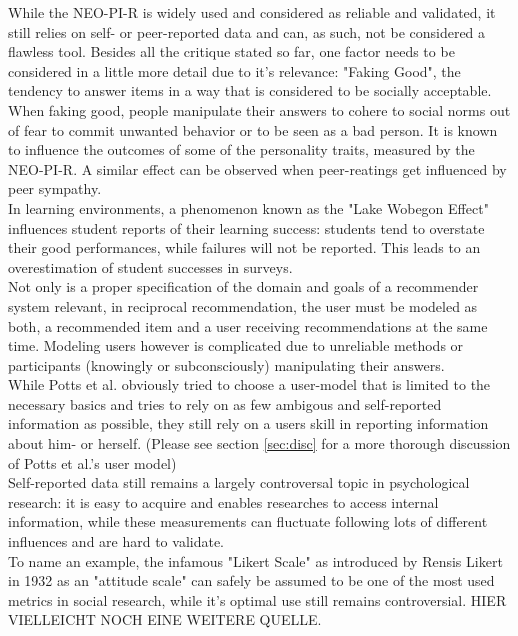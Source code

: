 \documentclass[nochapterpage,bigchapter,linedtoc,longdoc,colorback,accentcolor=tud3b,oneside]{tudreport}
\begin{document}
While the NEO-PI-R is widely used and considered as reliable and validated, it still relies on self- or peer-reported data and can, as such, not be considered a flawless tool. Besides all the critique stated so far, one factor needs to be considered in a little more detail due to it's relevance: "Faking Good", the tendency to answer items in a way that is considered to be socially acceptable. When faking good, people manipulate their answers to cohere to social norms out of fear to commit unwanted behavior or to be seen as a bad person. It is known to influence the outcomes of some of the personality traits, measured by the NEO-PI-R.\cite{griffin2004applicants} A similar effect can be observed when peer-reatings get influenced by peer sympathy. \cite{leising2010letter}\\
In learning environments, a phenomenon known as the "Lake Wobegon Effect" influences student reports of their learning success: students tend to overstate their good performances, while failures will not be reported. This leads to an overestimation of student successes in surveys. \cite{maxwell1994lake}\\
Not only is a proper specification of the domain and goals of a recommender system relevant, in reciprocal recommendation, the user must be modeled as both, a recommended item and a user receiving recommendations at the same time. Modeling users however is complicated due to unreliable methods or participants (knowingly or subconsciously) manipulating their answers.\\
While Potts et al. obviously tried to choose a user-model that is limited to the necessary basics and tries to rely on as few ambigous and self-reported information as possible, they still rely on a users skill in reporting information about him- or herself. (Please see section \ref{sec:disc} for a more thorough discussion of Potts et al.'s user model)\\
Self-reported data still remains a largely controversal topic in psychological research: it is easy to acquire and enables researches to access internal information,  while these measurements can fluctuate following lots of different influences and are hard to validate. \cite{gonyea2005self, lee2002cultural, sorensen2008measuring}\\
To name an example, the infamous "Likert Scale" as introduced by Rensis Likert in 1932 as an "attitude scale" \cite{likert1932technique} can safely be assumed to be one of the most used metrics in social research, while it's optimal use still remains controversial. \cite{chang1994psychometric, lee2002cultural} HIER VIELLEICHT NOCH EINE WEITERE QUELLE.\\
\end{document}
